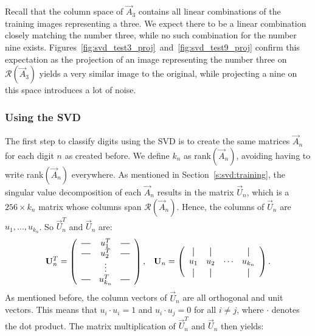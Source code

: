 Recall that the column space of \(\vec{A}_3\) contains all linear combinations of the training images representing a three.
We expect there to be a linear combination closely matching the number three, while no such combination for the number nine exists.
Figures~\ref{fig:svd_test3_proj}~and~\ref{fig:svd_test9_proj} confirm this expectation as the projection of an image representing the number three on \(\mathcal{R}(\vec{A}_3)\) yields a very similar image to the original, while projecting a nine on this space introduces a lot of noise.

\subsubsection{Using the SVD}\label{s:svd}
The first step to classify digits using the SVD is to create the same matrices \(\vec{A}_n\) for each digit \(n\) as created before.
We define \(k_n\) as rank\((\vec{A}_n)\), avoiding having to write rank\((\vec{A}_n)\) everywhere.
As mentioned in Section~\ref{s:svd:training}, the singular value decomposition of each \(\vec{A}_n\) results in the matrix \(\vec{U}_n\), which is a \(256\times k_n\) matrix whose columns span \(\mathcal{R}(\vec{A}_n)\).
Hence, the columns of \(\vec{U}_n\) are \(u_1, \ldots, u_{k_n}\).
So \(\vec{U}_n^T\) and \(\vec{U}_n\) are:
\begin{align*}
    \vec{U}_n^T = \left(
    \begin{array}{ccc}
            \horzbar & u_1^T    & \horzbar \\
            \horzbar & u_2^T    & \horzbar \\
                     & \vdots &          \\
            \horzbar & u_{k_n}^T  & \horzbar
        \end{array}
    \right),
     &  &
    \vec{U}_n = \left(\begin{array}{cccc}
            \vertbar & \vertbar &        & \vertbar \\
            u_1      & u_2      & \cdots & u_{k_n}    \\
            \vertbar & \vertbar &        & \vertbar
        \end{array}
    \right).
\end{align*}
As mentioned before, the column vectors of \(\vec{U}_n\) are all orthogonal and unit vectors.
This means that \(u_i \cdot u_i = 1\) and \(u_i \cdot u_j = 0\) for all \(i \neq j\), where \(\cdot \) denotes the dot product.
The matrix multiplication of \(\vec{U}_n^T\) and \(\vec{U}_n\) then yields:
